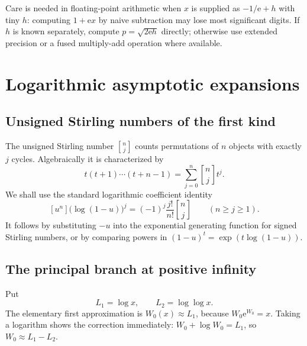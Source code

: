 \documentclass[11pt,oneside]{book}
\theoremstyle{definition}
\theoremstyle{remark}
\newcommand{\ee}{\mathrm e}
\newcommand{\stirlingone}[2]{\genfrac{[}{]}{0pt}{}{#1}{#2}}
\begin{document}
Care is needed in floating-point arithmetic when $x$ is supplied as
$-1/\ee+h$ with tiny $h$: computing $1+\ee x$ by naive subtraction may lose
most significant digits.  If $h$ is known separately, compute
$p=\sqrt{2\ee h}$ directly; otherwise use extended precision or a fused
multiply-add operation where available.

\chapter{Logarithmic asymptotic expansions}\label{ch:asymptotics}

\section{Unsigned Stirling numbers of the first kind}

The unsigned Stirling number $\stirlingone{n}{j}$ counts permutations of
$n$ objects with exactly $j$ cycles.  Algebraically it is characterized by
\begin{equation}\label{eq:stirlingrising}
 t(t+1)\cdots(t+n-1)=\sum_{j=0}^{n}\stirlingone{n}{j}t^j.
\end{equation}
We shall use the standard logarithmic coefficient identity
\begin{equation}\label{eq:logstirlingminus}
 [u^n]\bigl(\log(1-u)\bigr)^j
 =(-1)^j\frac{j!}{n!}\stirlingone{n}{j}
 \qquad(n\ge j\ge1).
\end{equation}
It follows by substituting $-u$ into the exponential generating function for
signed Stirling numbers, or by comparing powers in
$(1-u)^t=\exp(t\log(1-u))$.

\section{The principal branch at positive infinity}

Put
\begin{equation}\label{eq:L1L2}
 L_1=\log x,
 \qquad L_2=\log\log x.
\end{equation}
The elementary first approximation is $W_0(x)\approx L_1$, because
$W_0\ee^{W_0}=x$.  Taking a logarithm shows the correction immediately:
$W_0+\log W_0=L_1$, so $W_0\approx L_1-L_2$.
\end{document}
